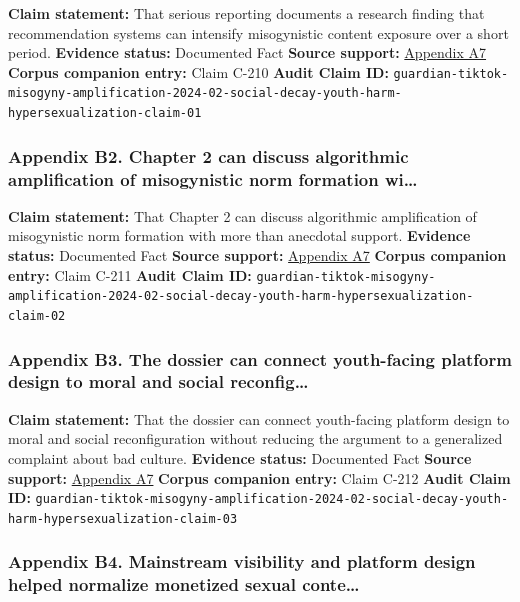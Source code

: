 \documentclass[
  american,
  11pt,
  letterpaper,
]{article}
\begin{document}
\textbf{Claim statement:} That serious reporting documents a research
finding that recommendation systems can intensify misogynistic content
exposure over a short period. \textbf{Evidence status:} Documented Fact
\textbf{Source support:}
\hyperref[appendix-a7-social-media-algorithms-amplifying-misogynistic-content]{Appendix
A7} \textbf{Corpus companion entry:} Claim C-210 \textbf{Audit Claim
ID:}
\texttt{guardian-tiktok-misogyny-amplification-2024-02-social-decay-youth-harm-hypersexualization-claim-01}

\subsubsection{Appendix B2. Chapter 2 can discuss algorithmic
amplification of misogynistic norm formation
wi\ldots{}}\label{appendix-b2-chapter-2-can-discuss-algorithmic-amplification-of-misogynistic-norm-formation-wi}

\textbf{Claim statement:} That Chapter 2 can discuss algorithmic
amplification of misogynistic norm formation with more than anecdotal
support. \textbf{Evidence status:} Documented Fact \textbf{Source
support:}
\hyperref[appendix-a7-social-media-algorithms-amplifying-misogynistic-content]{Appendix
A7} \textbf{Corpus companion entry:} Claim C-211 \textbf{Audit Claim
ID:}
\texttt{guardian-tiktok-misogyny-amplification-2024-02-social-decay-youth-harm-hypersexualization-claim-02}

\subsubsection{Appendix B3. The dossier can connect youth-facing
platform design to moral and social
reconfig\ldots{}}\label{appendix-b3-the-dossier-can-connect-youth-facing-platform-design-to-moral-and-social-reconfig}

\textbf{Claim statement:} That the dossier can connect youth-facing
platform design to moral and social reconfiguration without reducing the
argument to a generalized complaint about bad culture. \textbf{Evidence
status:} Documented Fact \textbf{Source support:}
\hyperref[appendix-a7-social-media-algorithms-amplifying-misogynistic-content]{Appendix
A7} \textbf{Corpus companion entry:} Claim C-212 \textbf{Audit Claim
ID:}
\texttt{guardian-tiktok-misogyny-amplification-2024-02-social-decay-youth-harm-hypersexualization-claim-03}

\subsubsection{Appendix B4. Mainstream visibility and platform design
helped normalize monetized sexual
conte\ldots{}}\label{appendix-b4-mainstream-visibility-and-platform-design-helped-normalize-monetized-sexual-conte}
\end{document}
